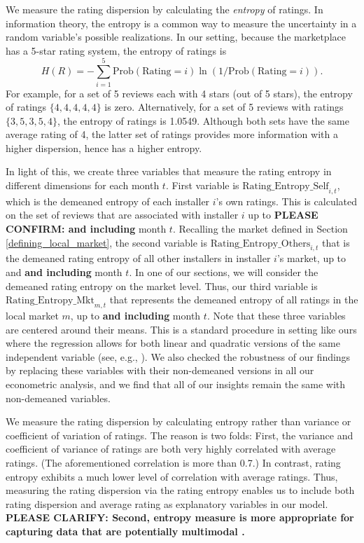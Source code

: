 \documentclass[msom,blindrev]{informs3}
\begin{document}
	We measure the rating dispersion by calculating the \emph{entropy} of ratings. In information theory, the entropy is a common way to measure  the uncertainty in a random variable's possible realizations. In our setting, because the marketplace has a 5-star rating system, the entropy of ratings is
	\begin{equation}\label{def: entropy}
	H(R)=-\sum_{i=1}^{5} \text{Prob}(\text{Rating}=i) \ln(1/\text{Prob}(\text{Rating}=i)).
	\end{equation}
	For example, for a set of 5 reviews each with 4 stars (out of 5 stars), the entropy of ratings $\{4,4,4,4,4\}$ is zero. Alternatively, for a set of 5 reviews with ratings $\{3,5,3,5,4\}$, the entropy of ratings is 1.0549. Although both sets have the same average rating of 4, the latter set of ratings provides more information with a higher dispersion, hence has a higher entropy.
	
	
	In light of this, we create three variables that measure the rating entropy in different dimensions for each month $t$. First variable is $\text{Rating\_Entropy\_Self}_{i,t}$, which is the demeaned entropy of each installer $i$'s own ratings. This is calculated on the set of reviews that are associated with installer $i$ up to \textbf{PLEASE CONFIRM: and including} month $t$. Recalling the market defined in Section \ref{defining_local_market}, the second variable is $\text{Rating\_Entropy\_Others}_{i,t}$ that is the demeaned rating entropy of all other installers in installer $i$'s market, up to and \textbf{and including} month $t$. In one of our sections, we will consider the demeaned rating entropy on the market level. Thus, our third variable is $\text{Rating\_Entropy\_Mkt}_{m,t}$ that represents the demeaned entropy of all ratings in the local market $m$, up to  \textbf{and including} month $t$. Note that these three variables are centered around their means. This is a standard procedure in setting like ours where the regression allows for both linear and quadratic versions of the same independent variable (see, e.g., \citep{tan2014does}). We also checked the robustness of our findings by replacing these variables with their non-demeaned versions in all our econometric analysis, and we find that all of our insights remain the same with non-demeaned variables.
	
	We measure the rating dispersion by calculating entropy rather than variance or coefficient of variation of ratings. The reason is two folds: First, the variance and coefficient of variance of ratings are both very highly correlated with average ratings. (The aforementioned correlation is more than 0.7.) In contrast, rating entropy exhibits a much lower level of correlation with average ratings. Thus, measuring the rating dispersion via the rating entropy enables us to include both rating dispersion and average rating as explanatory variables in our model. \textbf{PLEASE CLARIFY: Second, entropy measure is more appropriate for capturing data that are potentially multimodal \citep{smaldino2013measures}.}  
	
\end{document}
